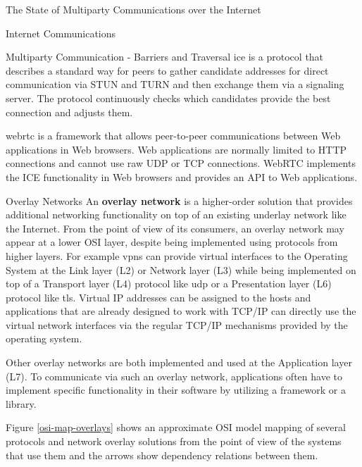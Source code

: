 \begin{frame}[fragile]{The State of Multiparty Communications over the
Internet}
\begin{block}{Internet Communications}
\begin{block}{Multiparty Communication - Barriers and Traversal}
\gls{ice} is a protocol that describes a standard way for peers to
gather candidate addresses for direct communication via STUN and TURN
and then exchange them via a signaling server. The protocol continuously
checks which candidates provide the best connection and adjusts them.

\gls{webrtc} is a framework that allows peer-to-peer communications
between Web applications in Web browsers. Web applications are normally
limited to HTTP connections and cannot use raw UDP or TCP connections.
WebRTC implements the ICE functionality in Web browsers and provides an
API to Web applications.

\end{block}
\end{block}

\begin{block}{Overlay Networks}
\protect\hypertarget{sec:overlays}{}
An \textbf{overlay network} is a higher-order solution that provides
additional networking functionality on top of an existing underlay
network like the Internet. From the point of view of its consumers, an
overlay network may appear at a lower OSI layer, despite being
implemented using protocols from higher layers. For example \glspl{vpn}
can provide virtual interfaces to the Operating System at the Link layer
(L2) or Network layer (L3) while being implemented on top of a Transport
layer (L4) protocol like \gls{udp} or a Presentation layer (L6) protocol
like \gls{tls}. Virtual IP addresses can be assigned to the hosts and
applications that are already designed to work with TCP/IP can directly
use the virtual network interfaces via the regular TCP/IP mechanisms
provided by the operating system.

Other overlay networks are both implemented and used at the Application
layer (L7). To communicate via such an overlay network, applications
often have to implement specific functionality in their software by
utilizing a framework or a library.

Figure \ref{osi-map-overlays} shows an approximate OSI model mapping of
several protocols and network overlay solutions from the point of view
of the systems that use them and the arrows show dependency relations
between them.


\end{block}
\end{frame}
